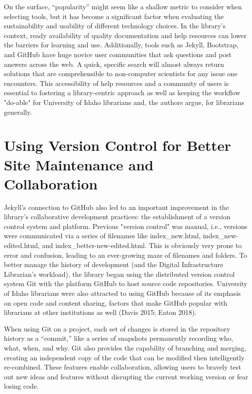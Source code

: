 \documentclass{book}
\begin{document}
On the surface, ``popularity'' might seem like a shallow metric to consider
when selecting tools, but it has become a significant factor when evaluating
the sustainability and usability of different technology choices. In the
library's context, ready availability of quality documentation and help
resources can lower the barriers for learning and use. Additionally, tools
such as Jekyll, Bootstrap, and GitHub have huge novice user communities that
ask questions and post answers across the web. A quick, specific search will
almost always return solutions that are comprehensible to non-computer
scientists for any issue one encounters. This accessibility of help resources
and a community of users is essential to fostering a library-centric approach
as well as keeping the workflow "do-able" for University of Idaho librarians
and, the authors argue, for librarians generally.

\hypertarget{using-version-control-for-better-site-maintenance-and-collaboration}{%
\section{Using Version Control for Better Site Maintenance and
Collaboration}\label{using-version-control-for-better-site-maintenance-and-collaboration}}

Jekyll's connection to GitHub also led to an important improvement in the
library's collaborative development practices: the establishment of a version
control system and platform. Previous "version control" was manual, i.e.,
versions were communicated via a series of filenames like index\_new.html,
index\_new-edited.html, and index\_better-new-edited.html. This is obviously
very prone to error and confusion, leading to an ever-growing maze of
filenames and folders. To better manage the history of development (and the
Digital Infrastructure Librarian's workload), the library began using the
distributed version control system Git with the platform GitHub to host source
code repositories. University of Idaho librarians were also attracted to using
GitHub because of its emphasis on open code and content sharing, factors that
make GitHub popular with librarians at other institutions as well (Davis 2015;
Eaton 2018).

When using Git on a project, each set of changes is stored in the repository
history as a ``commit,'' like a series of snapshots permanently recording who,
what, when, and why. Git also provides the capability of branching and
merging, creating an independent copy of the code that can be modified then
intelligently re-combined. These features enable collaboration, allowing users
to bravely test out new ideas and features without disrupting the current
working version or fear losing code.
\end{document}
